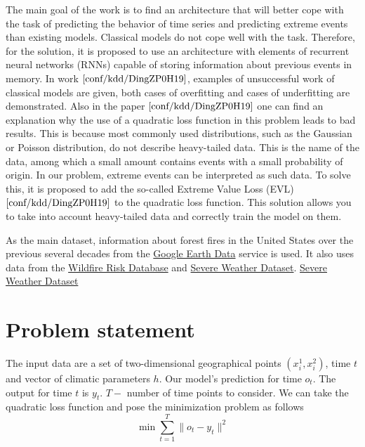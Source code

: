 \documentclass{article}
\begin{document}
The main goal of the work is to find an architecture that will better cope with the task of predicting the behavior of time series and predicting extreme events than existing models. Classical models do not cope well with the task. Therefore, for the solution, it is proposed to use an architecture with elements of recurrent neural networks (RNNs) capable of storing information about previous events in memory. In work $\cite{conf/kdd/DingZP0H19}$, examples of unsuccessful work of classical models are given, both cases of overfitting and cases of underfitting are demonstrated. Also in the paper $\cite{conf/kdd/DingZP0H19}$ one can find an explanation why the use of a quadratic loss function in this problem leads to bad results. This is because most commonly used distributions, such as the Gaussian or Poisson distribution, do not describe heavy-tailed data. This is the name of the data, among which a small amount contains events with a small probability of origin. In our problem, extreme events can be interpreted as such data. To solve this, it is proposed to add the so-called Extreme Value Loss (EVL) $\cite{conf/kdd/DingZP0H19}$ to the quadratic loss function. This solution allows you to take into account heavy-tailed data and correctly train the model on them. 

As the main dataset, information about forest fires in the United States over the previous several decades from the \href{https://developers.google.com/earth-engine/datasets/catalog/IDAHO_EPSCOR_TERRACLIMATE}{Google Earth Data} service is used. It also uses data from the \href{https://daac.ornl.gov/cgi-bin/theme_dataset_lister.pl?theme_id=8
}{Wildfire Risk Database} and \href{https://www.visualcrossing.com/weather/weather-data-services}{Severe Weather Dataset}. \href{https://www.visualcrossing.com/weather/weather-data-services}{Severe Weather Dataset}



\section{Problem statement}
\label{sec:headings}

The input data are a set of two-dimensional geographical points $(x_i^1, x_i^2)$, time $t$ and vector of climatic parameters $h$. Our model's prediction for time $o_t$. The output for time $t$ is $y_t$. $T - $ number of time points to consider. We can take the quadratic loss function and pose the minimization problem as follows
$$\min\sum\limits_{t = 1}^T\|o_t - y_t\|^2$$
\end{document}
